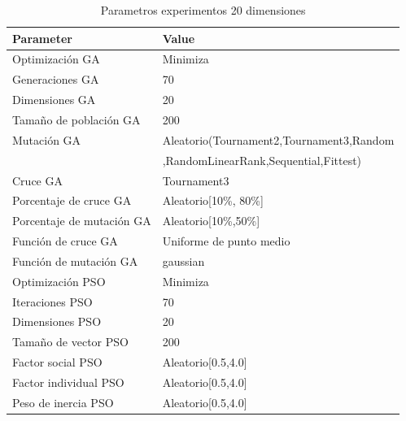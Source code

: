 \documentclass[runningheads]{llncs}
\begin{document}
          \begin{table}[htp]
            \caption{Parametros experimentos 20 dimensiones}
            \label{table:ga-pso-parameters-20}
            \centering
            \begin{tabular}{|l|l|}
            \hline
            Parameter & Value \\
            \hline
            \hline
            Optimizaci\'on GA & Minimiza \\
            \hline
            Generaciones GA & 70 \\
            \hline
            Dimensiones GA & 20 \\
            \hline
            Tama\~no de poblaci\'on GA & 200 \\
            \hline
            Mutaci\'on GA & Aleatorio(Tournament2,Tournament3,Random \\
            &  ,RandomLinearRank,Sequential,Fittest)\\
            \hline
            Cruce GA & Tournament3 \\
            \hline
            Porcentaje de cruce GA & Aleatorio[10\%, 80\%] \\
            \hline
            Porcentaje de mutaci\'on GA & Aleatorio[10\%,50\%] \\
            \hline
            Funci\'on de cruce GA & Uniforme de punto medio \\
            \hline
            Funci\'on de mutaci\'on GA & gaussian \\
            \hline
            Optimizaci\'on PSO & Minimiza \\
            \hline
            Iteraciones PSO & 70 \\
            \hline
            Dimensiones PSO & 20 \\
            \hline
            Tama\~no de vector PSO & 200 \\
            \hline
            Factor social PSO & Aleatorio[0.5,4.0] \\
            \hline
            Factor individual PSO & Aleatorio[0.5,4.0] \\
            \hline
            Peso de inercia PSO & Aleatorio[0.5,4.0] \\
            \hline
            \end{tabular}
            \end{table}
          
\end{document}
